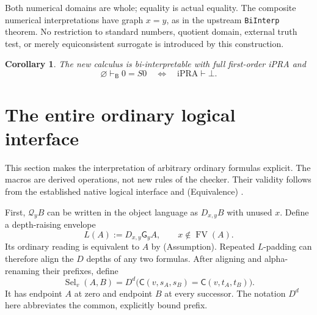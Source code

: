 \documentclass[11pt]{article}
\newtheorem{corollary}[theorem]{Corollary}
\theoremstyle{definition}
\theoremstyle{remark}
\newcommand{\ipra}{\mathrm{iPRA}}
\newcommand{\Bprf}{\mathsf{B}}
\newcommand{\sel}{\mathsf{C}}
\newcommand{\gate}{\mathsf{G}}
\newcommand{\FV}{\operatorname{FV}}
\newcommand{\entB}{\vdash_{\Bprf}}
\begin{document}
Both numerical domains are whole; equality is actual equality. The
composite numerical interpretations have graph $x=y$, as in the
upstream \texttt{BiInterp} theorem. No restriction to standard numbers,
quotient domain, external truth test, or merely equiconsistent surrogate
is introduced by this construction.

\begin{corollary}
The new calculus is bi-interpretable with full first-order iPRA and
\[
         \varnothing\entB 0=S0
         \quad\Longleftrightarrow\quad
         \ipra\vdash\bot.
\]
\end{corollary}

\section{The entire ordinary logical interface}

This section makes the interpretation of arbitrary ordinary formulas
explicit. The macros are derived operations, not new rules of the
checker. Their validity follows from the established native logical
interface and (Equivalence) \cite{logic}.

First, $\mathcal Q_yB$ can be written in the object language as
$D_{x,y}B$ with unused $x$. Define a depth-raising envelope
\[
                  L(A):=D_{x,y}\gate_y A,\qquad x\notin\FV(A).
\]
Its ordinary reading is equivalent to $A$ by (Assumption). Repeated
$L$-padding can therefore align the $D$ depths of any two formulas.
After aligning and alpha-renaming their prefixes, define
\[
 \operatorname{Sel}_v(A,B)=
 D^{d}\bigl(\sel(v,s_A,s_B)=\sel(v,t_A,t_B)\bigr).
\]
It has endpoint $A$ at zero and endpoint $B$ at every successor.
The notation $D^d$ here abbreviates the common, explicitly bound prefix.
\end{document}

